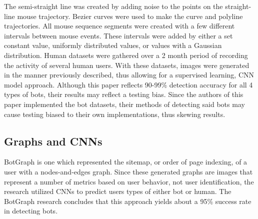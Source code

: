 The semi-straight line was created by adding noise to the points on the straight-line mouse trajectory.
Bezier curves were used to make the curve and polyline trajectories.
All mouse sequence segments were created with a few different intervals between mouse events.
These intervals were added by either a set constant value, uniformly distributed values, or values with a Gaussian distribution.
Human datasets were gathered over a 2 month period of recording the activity of several human users.
With these datasets, images were generated in the manner previously described, thus allowing for a supervised learning, CNN model approach.
Although this paper reflects 90-99\% detection accuracy for all 4 types of bots, their results may reflect a testing bias.
Since the authors of this paper implemented the bot datasets, their methods of detecting said bots may cause testing biased to their own implementations, thus skewing results.

\subsection{Graphs and CNNs}\label{subsec:graphs-and-cnns}
BotGraph\cite{botgraph} is one which represented the sitemap, or order of page indexing, of a user with a nodes-and-edges graph.
Since these generated graphs are images that represent a number of metrics based on user behavior, not user identification, the research utilized CNNs to predict users types of either bot or human.
The BotGraph research concludes that this approach yields about a 95\% success rate in detecting bots.

